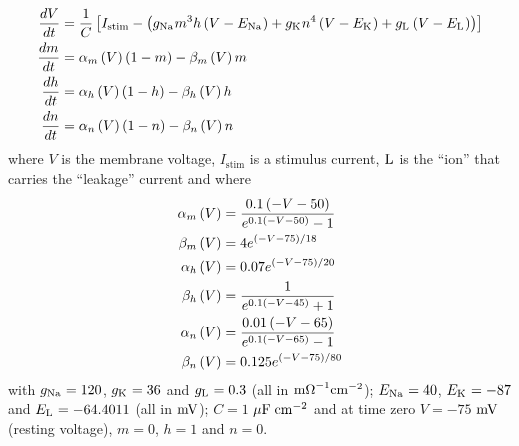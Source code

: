 \documentclass[12pt,dvips,fleqn]{article}
\begin{document}
\begin{equation*}
  \begin{split}
     \dfrac{ d V}{d t} &=\dfrac{1}{C}\left[ I_{\text{stim}}-\left( g_{\mathrm{{Na}^{}}}m^{3}h
        \left( V-E_{\mathrm{{Na}^{}}} \right)+g_{\mathrm{{K}^{}}}n^{4}\left( V-E_{\mathrm{{K}^{}}} \right)+
        g_{\mathrm{{L}^{}}}\left( V-E_{\mathrm{{L}^{}}} \right) \right) \right] \\
     \dfrac{ d m}{d t} &= \alpha_{m}\left( V \right) \left( 1-m \right)- \beta_{m}\left( V \right) m \\ 
     \dfrac{ d h}{d t} &= \alpha_{h}\left( V \right) \left( 1-h \right)- \beta_{h}\left( V \right) h \\ 
     \dfrac{ d n}{d t} &= \alpha_{n}\left( V \right) \left( 1-n \right)- \beta_{n}\left( V \right) n 
  \end{split}
\end{equation*}
where $V$ is the membrane voltage, $I_{\text{stim}}$ is a stimulus current,
$\mathrm{{L}^{}}$ is the ``ion'' that carries the ``leakage'' current and where
\begin{equation*}
  \begin{split}
     \alpha_{m}\left( V \right) &=\dfrac{0.1\left( -V-50 \right)}{e^{0.1\left( -V-50 \right)}-1} \\
     \beta_{m}\left( V \right) &=4e^{\left( -V-75 \right)/18} \\
     \alpha_{h}\left( V \right) &=0.07e^{\left( -V-75 \right)/20}\\
     \beta_{h}\left( V \right) &=\dfrac{1}{e^{0.1\left( -V-45 \right)}+1} \\
     \alpha_{n}\left( V \right) &=\dfrac{0.01\left( -V-65 \right)}{e^{0.1\left( -V-65 \right)}-1} \\
     \beta_{n}\left( V \right) &=0.125e^{\left( -V-75 \right)/80}
  \end{split}
\end{equation*}
with $g_{\mathrm{{Na}^{}}}=120$, $g_{\mathrm{{K}^{}}}=36$ and $g_{\mathrm{{L}^{}}}=0.3$ (all in 
$\mathrm{m\Omega}^{-1}\mathrm{cm}^{-2}$); $E_{\mathrm{{Na}^{}}}=40$, $E_{\mathrm{{K}^{}}}=-87$ and
$E_{\mathrm{{L}^{}}}=-64.4011$ (all in $\mathrm{mV}$); $C=1$ $\mathrm{\mu F\thickspace\mathrm{cm}^{-2}}$ and at time zero
$V=-75$ $\mathrm{mV}$ (resting voltage), $m=0$, $h=1$ and $n=0$.
\end{document}
